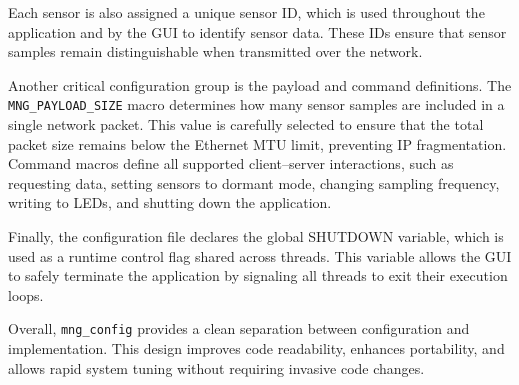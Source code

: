 Each sensor is also assigned a unique sensor ID, which is used throughout the 
application and by the GUI to identify sensor data. These IDs ensure that sensor 
samples remain distinguishable when transmitted over the network.

Another critical configuration group is the payload and command definitions. 
The \texttt{MNG\_PAYLOAD\_SIZE} macro determines how many sensor samples are included in a 
single network packet. This value is carefully selected to ensure that the total 
packet size remains below the Ethernet MTU limit, preventing IP fragmentation. 
Command macros define all supported client–server interactions, such as requesting 
data, setting sensors to dormant mode, changing sampling frequency, writing to LEDs,
and shutting down the application.

Finally, the configuration file declares the global SHUTDOWN variable, which is 
used as a runtime control flag shared across threads. This variable allows the GUI 
to safely terminate the application by signaling all threads to exit their execution 
loops.

Overall, \texttt{mng\_config} provides a clean separation between configuration and 
implementation. This design improves code readability, enhances portability, and 
allows rapid system tuning without requiring invasive code changes.



